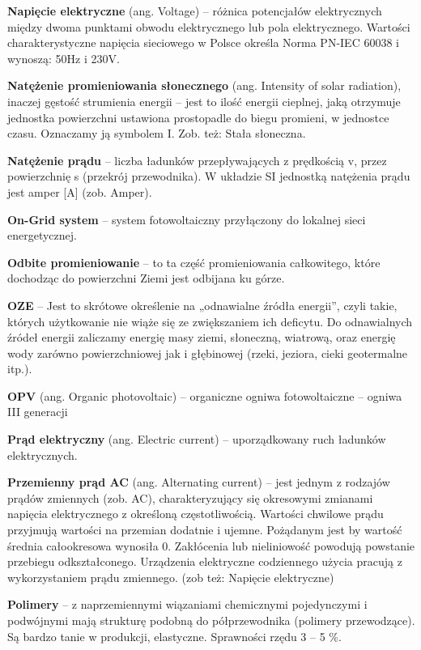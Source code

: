 \documentclass[12pt,a4paper]{article}
\begin{document}
\textbf{Napięcie elektryczne} (ang. Voltage) – różnica potencjałów elektrycznych między dwoma punktami obwodu elektrycznego lub pola elektrycznego. Wartości charakterystyczne napięcia sieciowego w Polsce określa Norma  PN-IEC 60038 i wynoszą: 50Hz i 230V.

\textbf{Natężenie promieniowania słonecznego} (ang. Intensity of solar radiation),  inaczej gęstość strumienia energii – jest to ilość energii cieplnej, jaką otrzymuje jednostka powierzchni ustawiona prostopadle do biegu promieni, w jednostce czasu. Oznaczamy ją symbolem I. Zob. też: Stała słoneczna.

\textbf{Natężenie prądu} – liczba ładunków przepływających z prędkością v, przez powierzchnię s (przekrój przewodnika). W układzie SI jednostką natężenia prądu jest amper [A] (zob. Amper).

\textbf{On-Grid system}  – system fotowoltaiczny przyłączony do lokalnej sieci energetycznej.

\textbf{Odbite promieniowanie}  – to ta część promieniowania całkowitego, które dochodząc do powierzchni Ziemi jest odbijana ku górze.

\textbf{OZE} –  Jest to skrótowe określenie na „odnawialne źródła energii”, czyli takie, których użytkowanie nie wiąże się ze zwiększaniem ich deficytu. Do odnawialnych źródeł energii zaliczamy energię masy ziemi, słoneczną, wiatrową, oraz energię wody zarówno powierzchniowej jak i głębinowej (rzeki, jeziora, cieki geotermalne itp.).

\textbf{OPV} (ang. Organic photovoltaic) – organiczne ogniwa fotowoltaiczne – ogniwa III generacji


\textbf{Prąd elektryczny} (ang. Electric current) – uporządkowany ruch ładunków elektrycznych.

\textbf{Przemienny prąd AC} (ang. Alternating current)  – jest jednym z rodzajów prądów zmiennych (zob. AC), charakteryzujący się okresowymi zmianami napięcia elektrycznego z określoną częstotliwością. Wartości chwilowe prądu przyjmują wartości na przemian dodatnie i ujemne. Pożądanym jest by wartość średnia całookresowa wynosiła 0. Zakłócenia lub nieliniowość powodują powstanie przebiegu odkształconego. Urządzenia elektryczne codziennego użycia pracują z wykorzystaniem prądu zmiennego. (zob też: Napięcie elektryczne)

\textbf{Polimery}  – z naprzemiennymi wiązaniami chemicznymi pojedynczymi i podwójnymi mają strukturę podobną do półprzewodnika (polimery przewodzące). Są bardzo tanie w produkcji, elastyczne. Sprawności rzędu 3 – 5 \%.
\end{document}
